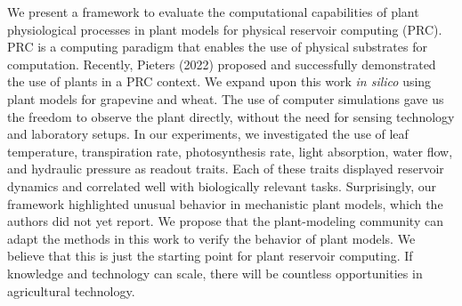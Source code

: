 We present a framework to evaluate the computational capabilities of plant physiological processes in plant models for physical reservoir computing (PRC).
PRC is a computing paradigm that enables the use of physical substrates for computation. 
Recently, Pieters (2022) proposed and successfully demonstrated the use of plants in a PRC context.
We expand upon this work \textit{in silico} using plant models for grapevine and wheat. 
The use of computer simulations gave us the freedom to observe the plant directly, without the need for sensing technology and laboratory setups.
In our experiments, we investigated the use of leaf temperature, transpiration rate, photosynthesis rate, light absorption, water flow, and hydraulic pressure as readout traits. 
Each of these traits displayed reservoir dynamics and correlated well with biologically relevant tasks. 
Surprisingly, our framework highlighted unusual behavior in mechanistic plant models, which the authors did not yet report.
We propose that the plant-modeling community can adapt the methods in this work to verify the behavior of plant models. 
We believe that this is just the starting point for plant reservoir computing.
If knowledge and technology can scale, there will be countless opportunities in agricultural technology.





